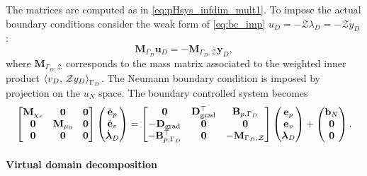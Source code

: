 The matrices are computed as in \eqref{eq:pHsys_infdim_mult1}. To impose the actual boundary conditions consider the weak form of \eqref{eq:bc_imp} $u_D=-\mathcal{Z}\lambda_D=-\mathcal{Z}y_D$:
\[ \mathbf{M}_{\Gamma_D} \mathbf{u}_D = - \mathbf{M}_{\Gamma_D, \mathcal{Z}} {\mathbf{y}}_D,
\]
where $\mathbf{M}_{\Gamma_D, \mathcal{Z}}$ corresponds to the mass matrix associated to the weighted inner product $\inner[\Gamma_D]{v_D}{\mathcal{Z} y_D}$. The Neumann boundary condition is imposed by projection on the $u_N$ space.   The boundary controlled system becomes   
\begin{equation}\label{eq:pHfindim_waves_phdae_bc}
\begin{bmatrix}
\mathbf{M}_{\chi_s} & \mathbf{0} & \mathbf{0}\\
\mathbf{0} & \mathbf{M}_{\mu_0} & \mathbf{0} \\
\mathbf{0} & \mathbf{0} & \mathbf{0} \\
\end{bmatrix}
\begin{pmatrix}
\dot{\mathbf{e}}_p\\
\dot{\mathbf{e}}_v\\
\dot{\bm{\lambda}}_D \\
\end{pmatrix}
= \begin{bmatrix}
\mathbf{0} & \mathbf{D}_{\grad}^\top & \mathbf{B}_{p, \Gamma_D}\\
-\mathbf{D}_{\grad} & \mathbf{0} & \mathbf{0} \\
-\mathbf{B}_{p, \Gamma_D}^\top & \mathbf{0} & -\mathbf{M}_{\Gamma_D, \mathcal{Z}} \\
\end{bmatrix}
\begin{pmatrix}
{\mathbf{e}}_p\\
{\mathbf{e}}_v\\
{\bm{\lambda}}_D \\
\end{pmatrix} + \begin{pmatrix}
\mathbf{b}_N \\
\mathbf{0}\\
\mathbf{0}\\
\end{pmatrix}.
\end{equation}

\paragraph{Virtual domain decomposition}

